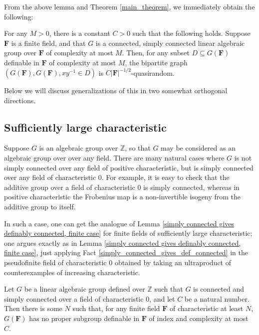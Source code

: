 \documentclass[10pt]{article}
\begin{document}
{From the above lemma and Theorem \ref{main_theorem}, we immediately obtain the following:

\begin{proposition}\label{simply connected theorem}
    For any $M>0$, there is a constant $C>0$ such that the following holds. Suppose $\mathbf{F}$ is a finite field, and that $G$ is a connected, simply connected linear algebraic group over $\mathbf{F}$ of complexity at most $M$. Then, for any subset $D\subseteq G(\mathbf{F})$ definable in $\mathbf{F}$ of complexity at most $M$, the bipartite graph $(G(\mathbf{F}),G(\mathbf{F}),xy^{-1}\in D)$ is $C|\mathbf{F}|^{-1/2}$-quasirandom.
\end{proposition}

Below we will discuss generalizations of this in two somewhat orthogonal directions.

\subsection{Sufficiently large characteristic}
Suppose $G$ is an algebraic group over $\mathbb{Z}$, so that $G$ may be considered as an algebraic group over over any field. There are many natural cases where $G$ is not simply connected over any field of positive characteristic, but is simply connected over any field of characteristic $0$. For example, it is easy to check that the additive group over a field of characteristic $0$ is simply connected, whereas in positive characteristic the Frobenius map is a non-invertible isogeny from the additive group to itself.

In such a case, one can get the analogue of Lemma \ref{simply connected gives definably connected, finite case} for finite fields of sufficiently large characteristic; one argues exactly as in Lemma \ref{simply connected gives definably connected, finite case}, just applying Fact \ref{simply_connected_gives_def_connected} in the pseudofinite field of characteristic $0$ obtained by taking an ultraproduct of counterexamples of increasing characteristic.

\begin{lemma}
    Let $G$ be a linear algebraic group defined over $\mathbb{Z}$ such that $G$ is connected and simply connected over a field of characteristic $0$, and let $C$ be a natural number. Then there is some $N$ such that, for any finite field $\mathbf{F}$ of characteristic at least $N$, $G(\mathbf{F})$ has no proper subgroup definable in $\mathbf{F}$ of index and complexity at most $C$.
\end{lemma}

}
\end{document}
